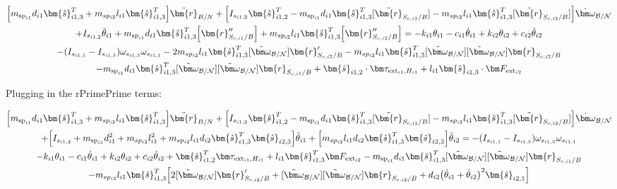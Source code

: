 \documentclass[paper]{aiaaNew}
\begin{document}
\begin{multline}
\Big[m_{\text{sp}_{i1}} d_{i1} \bm{\hat{s}}_{i1,3}^T + m_{sp_{i2}} l_{i1} \bm{\hat{s}}_{i1,3}^T \Big] \ddot{\bm{r}}_{B/N} + \Big[I_{s_{i1,2}} \bm{\hat{s}}_{i1,2}^T - m_{\text{sp}_{i1}} d_{i1} \bm{\hat{s}}_{i1,3}^T [\tilde{\bm{r}}_{S_{c,i1}/B}] - m_{sp_{i2}} l_{i1} \bm{\hat{s}}_{i1,3}^T [\tilde{\bm{r}}_{S_{c,i2}/B}] \Big] \dot{\bm \omega}_{\cal{B/N}} \\
+ I_{s_{i1,2}} \ddot{\theta}_{i1} + m_{\text{sp}_{i1}} d_{i1} \bm{\hat{s}}_{i1,3}^T \Big[ \bm{r}''_{S_{c,i1}/B} 
\Big] + m_{sp_{i2}} l_{i1} \bm{\hat{s}}_{i1,3}^T \Big[ \bm{r}''_{S_{c,i2}/B}\Big]
= -k_{i1} \theta_{i1} - c_{i1} \dot{\theta}_{i1} + k_{i2} \theta_{i2} + c_{i2} \dot{\theta}_{i2} \\
- (I_{s_{i1,1}} - I_{s_{i1,3}}) \omega_{s_{i1,3}} \omega_{s_{i1,1}} 
- 2 m_{sp_{i2}} l_{i1} \bm{\hat{s}}_{i1,3}^T [\tilde{\bm\omega}_{\cal B/N}] \bm{r}'_{S_{c,i2}/B}
- m_{sp_{i2}} l_{i1} \bm{\hat{s}}_{i1,3}^T [\tilde{\bm\omega}_{\cal B/N}] [\tilde{\bm\omega}_{\cal B/N}] \bm{r}_{S_{c,i2}/B}\\ 
- m_{\text{sp}_{i1}} d_{i1} \bm{\hat{s}}_{i1,3}^T [\tilde{\bm\omega}_{\cal B/N}] [\tilde{\bm\omega}_{\cal B/N}] \bm{r}_{S_{c,i1}/B}
+ \bm{\hat{s}}_{i1,2} \cdot \bm \tau_{\text{ext}_{i1},H_{i1}}
+ l_{i1} \bm{\hat{s}}_{i1,3} \cdot \bm F_{\text{ext}_{i2}} 
\end{multline}

Plugging in the rPrimePrime terms:

\begin{multline}
\Big[m_{\text{sp}_{i1}} d_{i1} \bm{\hat{s}}_{i1,3}^T + m_{sp_{i2}} l_{i1} \bm{\hat{s}}_{i1,3}^T \Big] \ddot{\bm{r}}_{B/N} + \Big[I_{s_{i1,2}} \bm{\hat{s}}_{i1,2}^T - m_{\text{sp}_{i1}} d_{i1} \bm{\hat{s}}_{i1,3}^T [\tilde{\bm{r}}_{S_{c,i1}/B}] - m_{sp_{i2}} l_{i1} \bm{\hat{s}}_{i1,3}^T [\tilde{\bm{r}}_{S_{c,i2}/B}] \Big] \dot{\bm \omega}_{\cal{B/N}} \\
+ \Big[I_{s_{i1,2}} + m_{\text{sp}_{i1}} d_{i1}^2 + m_{sp_{i2}} l_{i1}^2 + m_{sp_{i2}} l_{i1} d_{i2} \bm{\hat{s}}_{i1,3}^T \bm{\hat{s}}_{i2,3} \Big] \ddot{\theta}_{i1} + \Big[m_{sp_{i2}} l_{i1} d_{i2} \bm{\hat{s}}_{i1,3}^T \bm{\hat{s}}_{i2,3} \Big]\ddot{\theta}_{i2}
= - (I_{s_{i1,1}} - I_{s_{i1,3}}) \omega_{s_{i1,3}} \omega_{s_{i1,1}}\\ -k_{i1} \theta_{i1} - c_{i1} \dot{\theta}_{i1} 
+ k_{i2} \theta_{i2} + c_{i2} \dot{\theta}_{i2} + \bm{\hat{s}}_{i1,2}^T \bm \tau_{\text{ext}_{i1},H_{i1}}
+ l_{i1} \bm{\hat{s}}_{i1,3}^T \bm F_{\text{ext}_{i2}} 
- m_{\text{sp}_{i1}} d_{i1} \bm{\hat{s}}_{i1,3}^T [\tilde{\bm\omega}_{\cal B/N}] [\tilde{\bm\omega}_{\cal B/N}] \bm{r}_{S_{c,i1}/B}\\
 - m_{sp_{i2}} l_{i1} \bm{\hat{s}}_{i1,3}^T\Big[ 2 [\tilde{\bm\omega}_{\cal B/N}] \bm{r}'_{S_{c,i2}/B} + [\tilde{\bm\omega}_{\cal B/N}] [\tilde{\bm\omega}_{\cal B/N}] \bm{r}_{S_{c,i2}/B} + d_{i2} \big(\dot{\theta}_{i1} + \dot{\theta}_{i2}\big)^2 \bm{\hat{s}}_{i2,1}\Big]
\end{multline}
\end{document}
